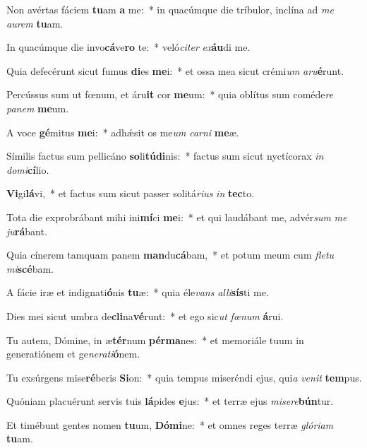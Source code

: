 \item Non avértas fáciem \textbf{tu}am \textbf{a} me:~* in quacúmque die tríbulor, inclína ad \textit{me} \textit{au}\textit{rem} \textbf{tu}am.
\item In quacúmque die invo\textbf{cá}ve\textbf{ro} te:~* veló\textit{ci}\textit{ter} \textit{ex}\textbf{áu}di me.
\item Quia defecérunt sicut fumus \textbf{di}es \textbf{me}i:~* et ossa mea sicut crémi\textit{um} \textit{a}\textit{ru}\textbf{é}runt.
\item Percússus sum ut fœnum, et áru\textbf{it} cor \textbf{me}um:~* quia oblítus sum coméde\textit{re} \textit{pa}\textit{nem} \textbf{me}um.
\item A voce \textbf{gé}mitus \textbf{me}i:~* adhǽsit os me\textit{um} \textit{car}\textit{ni} \textbf{me}æ.
\item Símilis factus sum pellicáno \textbf{so}li\textbf{tú}\textbf{di}nis:~* factus sum sicut nyctícorax \textit{in} \textit{do}\textit{mi}\textbf{cí}lio.
\item \textbf{Vi}gi\textbf{lá}vi,~* et factus sum sicut passer solitá\textit{ri}\textit{us} \textit{in} \textbf{tec}to.
\item Tota die exprobrábant mihi ini\textbf{mí}ci \textbf{me}i:~* et qui laudábant me, advér\textit{sum} \textit{me} \textit{ju}\textbf{rá}bant.
\item Quia cínerem tamquam panem \textbf{man}du\textbf{cá}bam,~* et potum meum cum \textit{fle}\textit{tu} \textit{mi}\textbf{scé}bam.
\item A fácie iræ et indignati\textbf{ó}nis \textbf{tu}æ:~* quia éle\textit{vans} \textit{al}\textit{li}\textbf{sís}ti me.
\item Dies mei sicut umbra de\textbf{cli}na\textbf{vé}runt:~* et ego sic\textit{ut} \textit{fœ}\textit{num} \textbf{á}rui.
\item Tu autem, Dómine, in æ\textbf{tér}num \textbf{pér}\textbf{ma}nes:~* et memoriále tuum in generatiónem et ge\textit{ne}\textit{ra}\textit{ti}\textbf{ó}nem.
\item Tu exsúrgens mise\textbf{ré}beris \textbf{Si}on:~* quia tempus miseréndi ejus, qui\textit{a} \textit{ve}\textit{nit} \textbf{tem}pus.
\item Quóniam placuérunt servis tuis \textbf{lá}pides \textbf{e}jus:~* et terræ ejus \textit{mi}\textit{se}\textit{re}\textbf{bún}tur.
\item Et timébunt gentes nomen \textbf{tu}um, \textbf{Dó}\textbf{mi}ne:~* et omnes reges terræ \textit{gló}\textit{ri}\textit{am} \textbf{tu}am.
